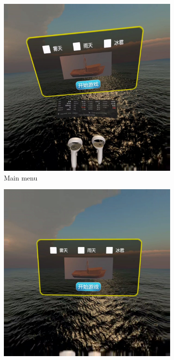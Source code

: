 \documentclass[a4paper,10pt]{article}
\begin{document}
		\begin{figure}[htbp] 
			\centering 
			
			\begin{subfigure}{0.23\textwidth}
				\includegraphics[width=\linewidth]{picture/Main menu-IP}
				\captionsetup{font=scriptsize}
				\caption{Main menu}
				\label{fig: Main menu-IP}
			\end{subfigure}
			\begin{subfigure}{0.23\textwidth}
				\includegraphics[width=\linewidth]{picture/Main menu-IP-1}

\end{subfigure}
\end{figure}
\end{document}
